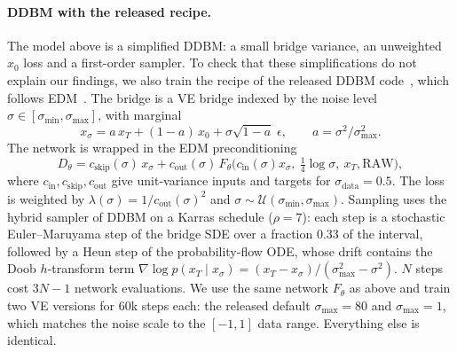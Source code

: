 \paragraph{DDBM with the released recipe.} The model above is a simplified DDBM: a small bridge variance, an unweighted $x_0$ loss and a first-order sampler. To check that these simplifications do not explain our findings, we also train the recipe of the released DDBM code~\cite{zhou2024ddbm}, which follows EDM~\cite{karras2022edm}. The bridge is a VE bridge indexed by the noise level $\sigma\in[\sigma_{\min},\sigma_{\max}]$, with marginal
\begin{equation}
x_\sigma = a\,x_T + (1-a)\,x_0 + \sigma\sqrt{1-a}\;\epsilon,\qquad a=\sigma^2/\sigma_{\max}^2 .
\end{equation}
The network is wrapped in the EDM preconditioning
\begin{equation}
D_\theta = c_{\text{skip}}(\sigma)\,x_\sigma + c_{\text{out}}(\sigma)\,F_\theta\big(c_{\text{in}}(\sigma)x_\sigma,\ \tfrac14\log\sigma,\ x_T,\text{RAW}\big),
\end{equation}
where $c_{\text{in}},c_{\text{skip}},c_{\text{out}}$ give unit-variance inputs and targets for $\sigma_{\text{data}}=0.5$. The loss is weighted by $\lambda(\sigma)=1/c_{\text{out}}(\sigma)^2$ and $\sigma\sim\mathcal U(\sigma_{\min},\sigma_{\max})$. Sampling uses the hybrid sampler of DDBM on a Karras schedule ($\rho=7$): each step is a stochastic Euler--Maruyama step of the bridge SDE over a fraction $0.33$ of the interval, followed by a Heun step of the probability-flow ODE, whose drift contains the Doob $h$-transform term $\nabla\log p(x_T\mid x_\sigma)=(x_T-x_\sigma)/(\sigma_{\max}^2-\sigma^2)$. $N$ steps cost $3N-1$ network evaluations. We use the same network $F_\theta$ as above and train two VE versions for 60k steps each: the released default $\sigma_{\max}=80$ and $\sigma_{\max}=1$, which matches the noise scale to the $[-1,1]$ data range. Everything else is identical.

